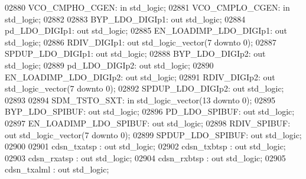 \begin{DoxyCode}
02880     VCO\_CMPHO\_CGEN:     \textcolor{keywordflow}{in} \textcolor{comment}{std\_logic};
02881     VCO\_CMPLO\_CGEN:     \textcolor{keywordflow}{in} \textcolor{comment}{std\_logic};
02882     
02883     BYP\_LDO\_DIGIp1: \textcolor{keywordflow}{out} \textcolor{comment}{std\_logic};
02884     pd\_LDO\_DIGIp1:  \textcolor{keywordflow}{out} \textcolor{comment}{std\_logic};
02885     EN\_LOADIMP\_LDO\_DIGIp1:  \textcolor{keywordflow}{out} \textcolor{comment}{std\_logic};
02886     RDIV\_DIGIp1:    \textcolor{keywordflow}{out} \textcolor{comment}{std\_logic\_vector}(\textcolor{vhdllogic}{}\textcolor{vhdllogic}{7} \textcolor{keywordflow}{downto} \textcolor{vhdllogic}{}\textcolor{vhdllogic}{0});
02887     SPDUP\_LDO\_DIGIp1:   \textcolor{keywordflow}{out} \textcolor{comment}{std\_logic};
02888     BYP\_LDO\_DIGIp2: \textcolor{keywordflow}{out} \textcolor{comment}{std\_logic};
02889     pd\_LDO\_DIGIp2:  \textcolor{keywordflow}{out} \textcolor{comment}{std\_logic};
02890     EN\_LOADIMP\_LDO\_DIGIp2:  \textcolor{keywordflow}{out} \textcolor{comment}{std\_logic};
02891     RDIV\_DIGIp2:    \textcolor{keywordflow}{out} \textcolor{comment}{std\_logic\_vector}(\textcolor{vhdllogic}{}\textcolor{vhdllogic}{7} \textcolor{keywordflow}{downto} \textcolor{vhdllogic}{}\textcolor{vhdllogic}{0});
02892     SPDUP\_LDO\_DIGIp2:   \textcolor{keywordflow}{out} \textcolor{comment}{std\_logic};
02893     
02894     SDM\_TSTO\_SXT:   \textcolor{keywordflow}{in} \textcolor{comment}{std\_logic\_vector}(\textcolor{vhdllogic}{}\textcolor{vhdllogic}{13} \textcolor{keywordflow}{downto} \textcolor{vhdllogic}{}\textcolor{vhdllogic}{0});
02895     BYP\_LDO\_SPIBUF: \textcolor{keywordflow}{out} \textcolor{comment}{std\_logic};
02896     PD\_LDO\_SPIBUF:  \textcolor{keywordflow}{out} \textcolor{comment}{std\_logic};
02897     EN\_LOADIMP\_LDO\_SPIBUF:  \textcolor{keywordflow}{out} \textcolor{comment}{std\_logic};
02898     RDIV\_SPIBUF:    \textcolor{keywordflow}{out} \textcolor{comment}{std\_logic\_vector}(\textcolor{vhdllogic}{}\textcolor{vhdllogic}{7} \textcolor{keywordflow}{downto} \textcolor{vhdllogic}{}\textcolor{vhdllogic}{0});
02899     SPDUP\_LDO\_SPIBUF:   \textcolor{keywordflow}{out} \textcolor{comment}{std\_logic};
02900     
02901     cdsn\_txatsp   : \textcolor{keywordflow}{out} \textcolor{comment}{std\_logic};
02902     cdsn\_txbtsp   : \textcolor{keywordflow}{out} \textcolor{comment}{std\_logic};
02903     cdsn\_rxatsp   : \textcolor{keywordflow}{out} \textcolor{comment}{std\_logic};
02904     cdsn\_rxbtsp   : \textcolor{keywordflow}{out} \textcolor{comment}{std\_logic};
02905     cdsn\_txalml   : \textcolor{keywordflow}{out} \textcolor{comment}{std\_logic};

\end{DoxyCode}
